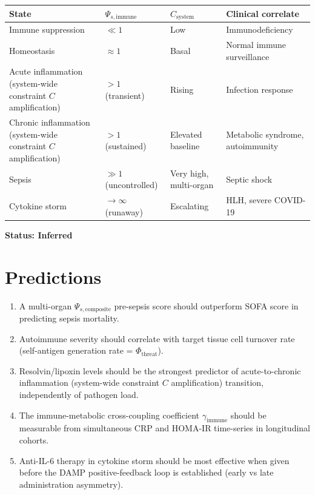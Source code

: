 \documentclass[12pt,a4paper]{article}
\begin{document}
\begin{center}
\begin{tabular}{llll}
\toprule
State & $\Psi_{s,\mathrm{immune}}$ & $C_{\mathrm{system}}$ & Clinical correlate \\
\midrule
Immune suppression & $\ll 1$ & Low & Immunodeficiency \\
Homeostasis & $\approx 1$ & Basal & Normal immune surveillance \\
Acute inflammation (system-wide constraint $C$ amplification) & $> 1$ (transient) & Rising & Infection response \\
Chronic inflammation (system-wide constraint $C$ amplification) & $> 1$ (sustained) & Elevated baseline & Metabolic syndrome, autoimmunity \\
Sepsis & $\gg 1$ (uncontrolled) & Very high, multi-organ & Septic shock \\
Cytokine storm & $\to \infty$ (runaway) & Escalating & HLH, severe COVID-19 \\
\bottomrule
\end{tabular}
\end{center}

\textbf{Status: Inferred}

\section{Predictions}

\begin{enumerate}
    \item A multi-organ $\Psi_{s,\mathrm{composite}}$ pre-sepsis score should outperform SOFA score in predicting sepsis mortality.
    \item Autoimmune severity should correlate with target tissue cell turnover rate (self-antigen generation rate = $\Phi_{\mathrm{threat}}$).
    \item Resolvin/lipoxin levels should be the strongest predictor of acute-to-chronic inflammation (system-wide constraint $C$ amplification) transition, independently of pathogen load.
    \item The immune-metabolic cross-coupling coefficient $\gamma_{\mathrm{immune}}$ should be measurable from simultaneous CRP and HOMA-IR time-series in longitudinal cohorts.
    \item Anti-IL-6 therapy in cytokine storm should be most effective when given before the DAMP positive-feedback loop is established (early vs late administration asymmetry).
\end{enumerate}
\end{document}

